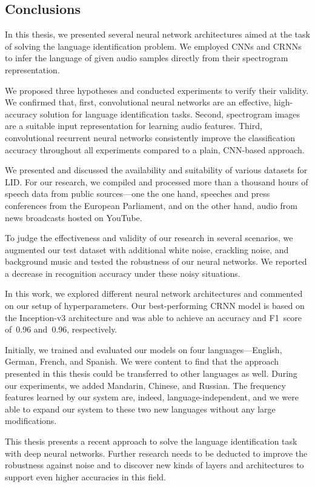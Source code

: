 \subsection{Conclusions}
In this thesis, we presented several neural network architectures aimed at the task of solving the language identification problem. We employed CNNs and CRNNs to infer the language of given audio samples directly from their spectrogram representation. 

We proposed three hypotheses and conducted experiments to verify their validity. We confirmed that, first, convolutional neural networks are an effective, high-accuracy solution for language identification tasks. Second, spectrogram images are a suitable input representation for learning audio features. Third, convolutional recurrent neural networks consistently improve the classification accuracy throughout all experiments compared to a plain, CNN-based approach.

We presented and discussed the availability and suitability of various datasets for LID. For our research, we compiled and processed more than a thousand hours of speech data from public sources---one the one hand, speeches and press conferences from the European Parliament, and on the other hand, audio from news broadcasts hosted on YouTube.

To judge the effectiveness and validity of our research in several scenarios, we augmented our test dataset with additional white noise, crackling noise, and background music and tested the robustness of our neural networks. We reported a decrease in recognition accuracy under these noisy situations.

In this work, we explored different neural network architectures and commented on our setup of hyperparameters. Our best-performing CRNN model is based on the Inception-v3 architecture and was able to achieve an accuracy and F1~score of~\num{0.96} and~\num{0.96}, respectively.

Initially, we trained and evaluated our models on four languages---English, German, French, and Spanish. We were content to find that the approach presented in this thesis could be transferred to other languages as well. During our experiments, we added Mandarin, Chinese, and Russian. The frequency features learned by our system are, indeed, language-independent, and we were able to expand our system to these two new languages without any large modifications.

This thesis presents a recent approach to solve the language identification task with deep neural networks. Further research needs to be deducted to improve the robustness against noise and to discover new kinds of layers and architectures to support even higher accuracies in this field. 
